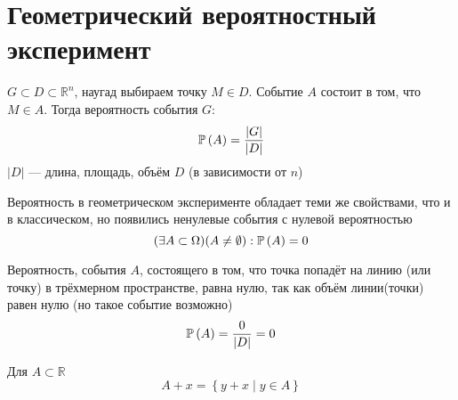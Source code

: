 \section{Геометрический вероятностный эксперимент}
\begin{example}
    $G\subset D\subset \mathbb{R}^n$, наугад выбираем точку $M\in D$.
    Событие $A$ состоит в том, что $M\in A$. Тогда вероятность события $G$:
    $$\mathbb{P}\left( A \right)=\frac{\left|G\right|}{\left|D\right|}$$
    $\left|D\right|$ --- длина, площадь, объём $D$ (в зависимости от $n$)
\end{example}
Вероятность в геометрическом эксперименте обладает теми же свойствами,
что и в классическом, но появились ненулевые события с нулевой вероятностью
$$(\exists A\subset\Omega)(A\neq\emptyset): \mathbb{P}\left( A \right)=0$$
\begin{example}
    Вероятность, события $A$, состоящего в том,
    что точка попадёт на линию (или точку) в трёхмерном пространстве,
    равна нулю, так как объём линии(точки) равен нулю
    (но такое событие возможно)
    $$\mathbb{P}\left( A \right)=\frac{0}{\left|D\right|}=0$$
\end{example}

\begin{definition}
    Для $A\subset\mathbb{R}$
    $$A+x=\left\{y+x\mid y\in A\right\}$$
\end{definition}

